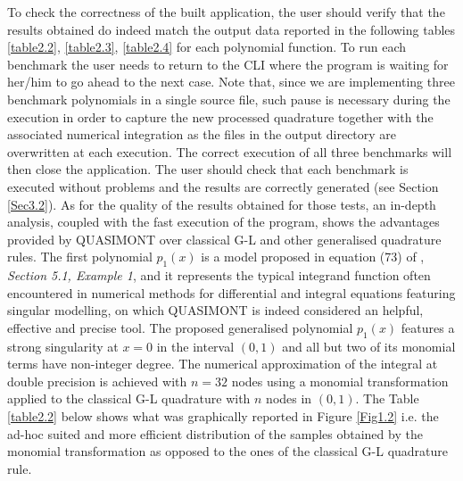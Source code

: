 \documentclass[a4paper, twosided]{book}
\begin{document}
\noindent
To check the correctness of the built application, the user should verify that the results obtained do indeed match the output data reported in the following tables \ref{table2.2}, \ref{table2.3}, \ref{table2.4} for each polynomial function. To run each benchmark the user needs to return to the CLI where the program is waiting for her/him to go ahead to the next case. Note that, since we are implementing three benchmark polynomials in a single source file, such pause is necessary during the execution in order to capture the new processed quadrature together with the associated numerical integration as the files in the output directory are overwritten at each execution. The correct execution of all three benchmarks will then close the application. The user should check that each benchmark is executed without problems and the results are correctly generated (see Section \ref{Sec3.2}). As for the quality of the results obtained for those tests, an in-depth analysis, coupled with the fast execution of the program, shows the advantages provided by QUASIMONT over classical G-L and other generalised quadrature rules. The first polynomial $p_1(x)$ is a model proposed in equation (73) of \cite{Lombardi09}, \textsl{Section 5.1, Example 1}, and it represents the typical integrand function often encountered in numerical methods for differential and integral equations featuring singular modelling, on which QUASIMONT is indeed considered an helpful, effective and precise tool. The proposed generalised polynomial $p_1(x)$ features a strong singularity at $x=0$ in the interval $(0,1)$ and all but two of its monomial terms have non-integer degree. The numerical approximation of the integral at double precision is achieved with $n=32$ nodes using a monomial transformation applied to the classical G-L quadrature with $n$ nodes in $(0,1)$. The Table \ref{table2.2} below shows what was graphically reported in Figure \ref{Fig1.2} i.e. the ad-hoc suited and more efficient distribution of the samples obtained by the monomial transformation as opposed to the ones of the classical G-L quadrature rule.
\end{document}
